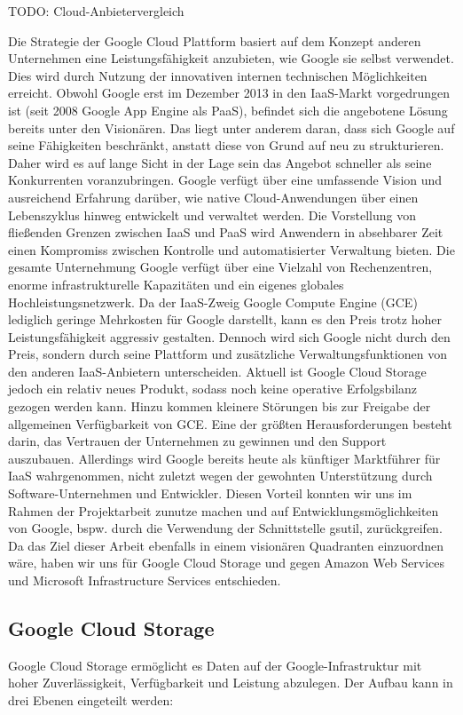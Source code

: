 \documentclass[12pt,a4paper,bibliography=totocnumbered,listof=totocnumbered]{scrartcl}
\begin{document}
TODO: Cloud-Anbietervergleich

Die Strategie der Google Cloud Plattform basiert auf dem Konzept anderen Unternehmen eine Leistungsfähigkeit anzubieten, wie Google sie selbst verwendet. Dies wird durch Nutzung der innovativen internen technischen Möglichkeiten erreicht. Obwohl Google erst im Dezember 2013 in den IaaS-Markt vorgedrungen ist (seit 2008 Google App Engine als PaaS), befindet sich die angebotene Lösung bereits unter den Visionären. Das liegt unter anderem daran, dass sich Google auf seine Fähigkeiten beschränkt, anstatt diese von Grund auf neu zu strukturieren. Daher wird es auf lange Sicht in der Lage sein das Angebot schneller als seine Konkurrenten voranzubringen. Google verfügt über eine umfassende Vision und ausreichend Erfahrung darüber, wie native Cloud-Anwendungen über einen Lebenszyklus hinweg entwickelt und verwaltet werden. Die Vorstellung von fließenden Grenzen zwischen IaaS und PaaS wird Anwendern in absehbarer Zeit einen Kompromiss zwischen Kontrolle und automatisierter Verwaltung bieten. Die gesamte Unternehmung Google verfügt über eine Vielzahl von Rechenzentren, enorme infrastrukturelle Kapazitäten und ein eigenes globales Hochleistungsnetzwerk. Da der IaaS-Zweig Google Compute Engine (GCE) lediglich geringe Mehrkosten für Google darstellt, kann es den Preis trotz hoher Leistungsfähigkeit aggressiv gestalten. Dennoch wird sich Google nicht durch den Preis, sondern durch seine Plattform und zusätzliche Verwaltungsfunktionen von den anderen IaaS-Anbietern unterscheiden. Aktuell ist Google Cloud Storage jedoch ein relativ neues Produkt, sodass noch keine operative Erfolgsbilanz gezogen werden kann. Hinzu kommen kleinere Störungen bis zur Freigabe der allgemeinen Verfügbarkeit von GCE. Eine der größten Herausforderungen besteht darin, das Vertrauen der Unternehmen zu gewinnen und den Support auszubauen. Allerdings wird Google bereits heute als künftiger Marktführer für IaaS wahrgenommen, nicht zuletzt wegen der gewohnten Unterstützung durch Software-Unternehmen und Entwickler. Diesen Vorteil konnten wir uns im Rahmen der Projektarbeit zunutze machen und auf Entwicklungsmöglichkeiten von Google, bspw. durch die Verwendung der Schnittstelle gsutil, zurückgreifen. Da das Ziel dieser Arbeit ebenfalls in einem visionären Quadranten einzuordnen wäre, haben wir uns für Google Cloud Storage und gegen Amazon Web Services und Microsoft Infrastructure Services entschieden.

\subsection{Google Cloud Storage}
Google Cloud Storage ermöglicht es Daten auf der Google-Infrastruktur mit hoher Zuverlässigkeit, Verfügbarkeit und Leistung abzulegen. Der Aufbau kann in drei Ebenen \cite{40} eingeteilt werden:
\end{document}
